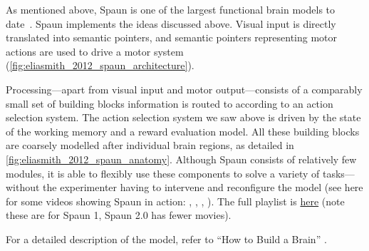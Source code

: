 \documentclass[10pt,letterpaper,oneside]{article}
\begin{document}
As mentioned above, Spaun is one of the largest functional brain models to date~\cite{eliasmith2012largescale}. Spaun implements the ideas discussed above. Visual input is directly translated into semantic pointers, and semantic pointers representing motor actions are used to drive a motor system (\cref{fig:eliasmith_2012_spaun_architecture}).

Processing---apart from visual input and motor output---consists of a comparably small set of building blocks information is routed to according to an action selection system. The action selection system we saw above is driven by the state of the working memory and a reward evaluation model. All these building blocks are coarsely modelled after individual brain regions, as detailed in \cref{fig:eliasmith_2012_spaun_anatomy}. Although Spaun consists of relatively few modules, it is able to flexibly use these components to solve a variety of tasks---without the experimenter having to intervene and reconfigure the model (see here for some videos showing Spaun in action: , , , ). The full playlist is \href{https://www.youtube.com/playlist?list=PLYLu6sY3jnoV2DNi84T5OKqJ0oYTxFrQv}{here} (note these are for Spaun 1, Spaun 2.0 has fewer movies).

For a detailed description of the model, refer to \enquote{How to Build a Brain} \cite{eliasmith2013how}.

\printbibliography
\end{document}
